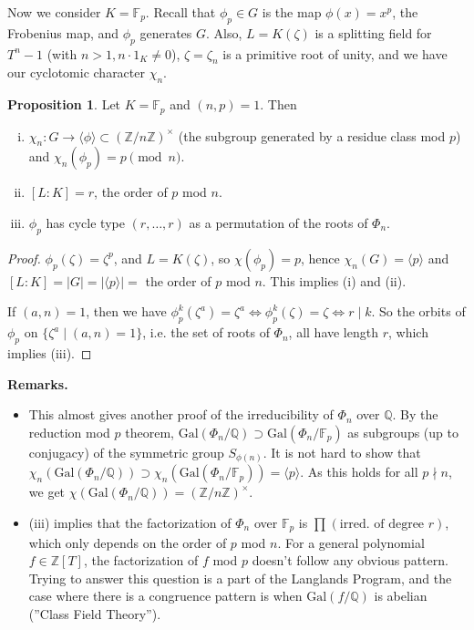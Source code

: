 \documentclass{article}
\theoremstyle{definition}
\newtheorem{prop}[theorem]{Proposition}
\begin{document}
Now we consider $K=\mathbb{F}_p$. Recall that $\phi_p \in G$ is the map $\phi(x)=x^p$, the Frobenius map, and $\phi_p$ generates $G$. Also, $L = K(\zeta)$ is a splitting field for $T^n-1$ (with $n>1, n\cdot 1_K \neq 0$), $\zeta = \zeta_n$ is a primitive root of unity, and we have our cyclotomic character $\chi_n$.
\begin{prop}
    Let $K=\mathbb{F}_p$ and $(n,p)=1$. Then
    \begin{enumerate}[(i)]
        \item $\chi_n : G \to \langle \phi \rangle \subset (\mathbb{Z}/n\mathbb{Z})^\times$ (the subgroup generated by a residue class mod $p$) and $\chi_n(\phi_p)=p \pmod{n}$.
        \item $[L:K]=r$, the order of $p$ mod $n$.
        \item $\phi_p$ has cycle type $(r,\ldots,r)$ as a permutation of the roots of $\Phi_n$.
    \end{enumerate}
\end{prop}
\begin{proof}
    $\phi_p(\zeta)=\zeta^p$, and $L=K(\zeta)$, so $\chi(\phi_p)=p$, hence $\chi_n(G)=\langle p \rangle$ and $[L:K] = |G| = |\langle p \rangle| =$ the order of $p$ mod $n$. This implies (i) and (ii).
    \vspace{1mm}
    
    If $(a,n)=1$, then we have $\phi_p^k(\zeta^a)=\zeta^a \iff \phi_p^k(\zeta)=\zeta \iff r \mid k$. So the orbits of $\phi_p$ on $\{\zeta^a \mid (a,n)=1\}$, i.e. the set of roots of $\Phi_n$, all have length $r$, which implies (iii). 
\end{proof} 
\textbf{Remarks.}
\begin{itemize}
    \item This almost gives another proof of the irreducibility of $\Phi_n$ over $\mathbb{Q}$. By the reduction mod $p$ theorem, $\text{Gal}(\Phi_n/\mathbb{Q}) \supset \text{Gal}(\Phi_n/\mathbb{F}_p)$ as subgroups (up to conjugacy) of the symmetric group $S_{\phi(n)}$. It is not hard to show that $\chi_n(\text{Gal}(\Phi_n/\mathbb{Q})) \supset \chi_n(\text{Gal}(\Phi_n/\mathbb{F}_p)) = \langle p \rangle$. As this holds for all $p \nmid n$, we get $\chi(\text{Gal}(\Phi_n/\mathbb{Q}))=(\mathbb{Z}/n\mathbb{Z})^\times$.
    \item (iii) implies that the factorization of $\Phi_n$ over $\mathbb{F}_p$ is $\prod_{}^{} (\text{irred. of degree }r)$, which only depends on the order of $p$ mod $n$. For a general polynomial $f \in \mathbb{Z}[T]$, the factorization of $f$ mod $p$ doesn't follow any obvious pattern. Trying to answer this question is a part of the Langlands Program, and the case where there is a congruence pattern is when $\text{Gal}(f/\mathbb{Q})$ is abelian (''Class Field Theory'').
\end{itemize}
\end{document}
